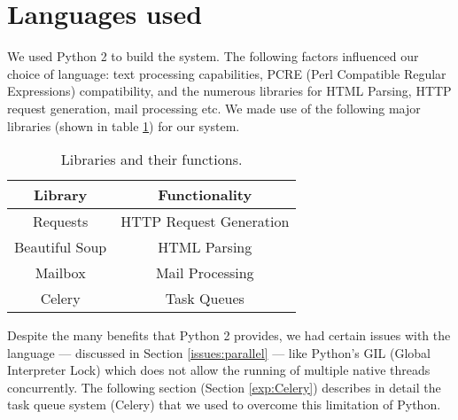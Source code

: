 \section{Languages used}

We used Python 2 to build the system. The following factors influenced our choice of language: text processing capabilities, PCRE (Perl Compatible Regular Expressions) compatibility, and the numerous libraries for HTML Parsing, HTTP request generation, mail processing etc.
We made use of the following major libraries (shown in table \ref{tab:libs}) for our system.

\begin{table}[!htbp]
	\centering
	\begin{tabular}{|c|c|}
		\hline
		\multicolumn{1}{|c|}{\textbf{Library}} &
		\multicolumn{1}{c|}{\textbf{Functionality}} \\
		\hline
		Requests & HTTP Request Generation\\
		\hline
		Beautiful Soup & HTML Parsing\\
		\hline
		Mailbox & Mail Processing\\
		\hline
		Celery & Task Queues\\
		\hline
	\end{tabular}
	\caption{Libraries and their functions.}
	\label{tab:libs}
\end{table}

Despite the many benefits that Python 2 provides, we had certain issues with the language --- discussed in Section \ref{issues:parallel} --- like Python's GIL (Global Interpreter Lock) which does not allow the running of multiple native threads concurrently.
The following section (Section \ref{exp:Celery}) describes in detail the task queue system (Celery) that we used to overcome this limitation of Python.
